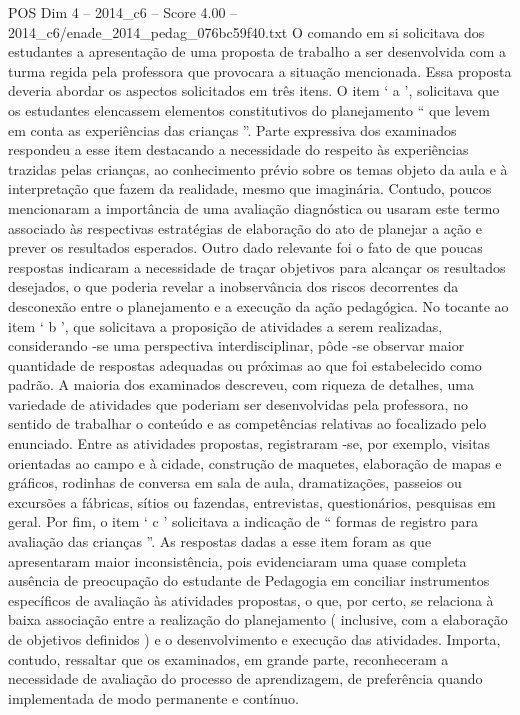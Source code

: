 \begin{textsample}{POS Dim 4 – 2014\_c6 – Score 4.00 – 2014\_c6/enade\_2014\_pedag\_076bc59f40.txt}
O comando em si solicitava dos estudantes a apresentação de uma proposta de trabalho a ser desenvolvida com a turma regida pela professora que provocara a situação mencionada.
Essa proposta deveria abordar os aspectos solicitados em três itens.
O item ‘ a ’, solicitava que os estudantes elencassem elementos constitutivos do planejamento “ que levem em conta as experiências das crianças ”.
Parte expressiva dos examinados respondeu a esse item destacando a necessidade do respeito às experiências trazidas pelas crianças, ao conhecimento prévio sobre os temas objeto da aula e à interpretação que fazem da realidade, mesmo que imaginária.
Contudo, poucos mencionaram a importância de uma avaliação diagnóstica ou usaram este termo associado às respectivas estratégias de elaboração do ato de planejar a ação e prever os resultados esperados.
Outro dado relevante foi o fato de que poucas respostas indicaram a necessidade de traçar objetivos para alcançar os resultados desejados, o que poderia revelar a inobservância dos riscos decorrentes da desconexão entre o planejamento e a execução da ação pedagógica.
No tocante ao item ‘ b ’, que solicitava a proposição de atividades a serem realizadas, considerando -se uma perspectiva interdisciplinar, pôde -se observar maior quantidade de respostas adequadas ou próximas ao que foi estabelecido como padrão.
A maioria dos examinados descreveu, com riqueza de detalhes, uma variedade de atividades que poderiam ser desenvolvidas pela professora, no sentido de trabalhar o conteúdo e as competências relativas ao focalizado pelo enunciado.
Entre as atividades propostas, registraram -se, por exemplo, visitas orientadas ao campo e à cidade, construção de maquetes, elaboração de mapas e gráficos, rodinhas de conversa em sala de aula, dramatizações, passeios ou excursões a fábricas, sítios ou fazendas, entrevistas, questionários, pesquisas em geral.
Por fim, o item ‘ c ’ solicitava a indicação de “ formas de registro para avaliação das crianças ”.
As respostas dadas a esse item foram as que apresentaram maior inconsistência, pois evidenciaram uma quase completa ausência de preocupação do estudante de Pedagogia em conciliar instrumentos específicos de avaliação às atividades propostas, o que, por certo, se relaciona à baixa associação entre a realização do planejamento ( inclusive, com a elaboração de objetivos definidos ) e o desenvolvimento e execução das atividades.
Importa, contudo, ressaltar que os examinados, em grande parte, reconheceram a necessidade de avaliação do processo de aprendizagem, de preferência quando implementada de modo permanente e contínuo.

\end{textsample}
